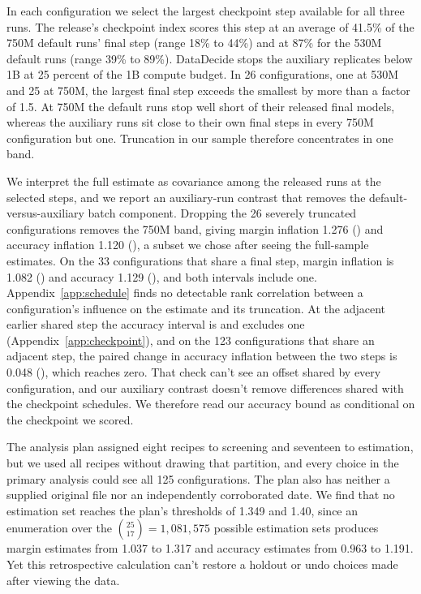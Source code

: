 In each configuration we select the largest checkpoint step available for all three runs. The release's checkpoint index scores this step at an average of 41.5\% of the 750M default runs' final step (range 18\% to 44\%) and at 87\% for the 530M default runs (range 39\% to 89\%). DataDecide stops the auxiliary replicates below 1B at 25 percent of the 1B compute budget. In 26 configurations, one at 530M and 25 at 750M, the largest final step exceeds the smallest by more than a factor of 1.5. At 750M the default runs stop well short of their released final models, whereas the auxiliary runs sit close to their own final steps in every 750M configuration but one. Truncation in our sample therefore concentrates in one band.

We interpret the full estimate as covariance among the released runs at the selected steps, and we report an auxiliary-run contrast that removes the default-versus-auxiliary batch component. Dropping the 26 severely truncated configurations removes the 750M band, giving margin inflation 1.276 () and accuracy inflation 1.120 (), a subset we chose after seeing the full-sample estimates. On the 33 configurations that share a final step, margin inflation is 1.082 () and accuracy 1.129 (), and both intervals include one. Appendix~\ref{app:schedule} finds no detectable rank correlation between a configuration's influence on the estimate and its truncation. At the adjacent earlier shared step the accuracy interval is  and excludes one (Appendix~\ref{app:checkpoint}), and on the 123 configurations that share an adjacent step, the paired change in accuracy inflation between the two steps is 0.048 (), which reaches zero. That check can't see an offset shared by every configuration, and our auxiliary contrast doesn't remove differences shared with the checkpoint schedules. We therefore read our accuracy bound as conditional on the checkpoint we scored.

The analysis plan assigned eight recipes to screening and seventeen to estimation, but we used all recipes without drawing that partition, and every choice in the primary analysis could see all 125 configurations. The plan also has neither a supplied original file nor an independently corroborated date. We find that no estimation set reaches the plan's thresholds of 1.349 and 1.40, since an enumeration over the $\binom{25}{17}=1{,}081{,}575$ possible estimation sets produces margin estimates from 1.037 to 1.317 and accuracy estimates from 0.963 to 1.191. Yet this retrospective calculation can't restore a holdout or undo choices made after viewing the data.

